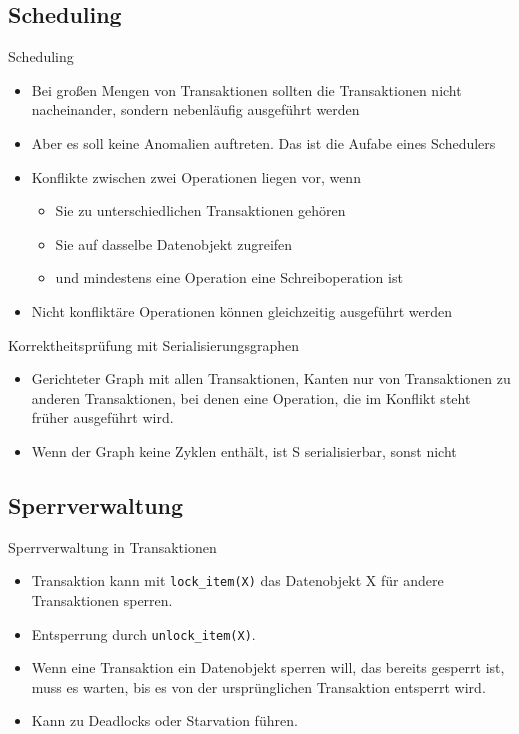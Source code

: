 \documentclass{article}
\begin{document}
\subsection*{Scheduling}
\begin{block}{Scheduling}
  \begin{itemize}
    \item Bei großen Mengen von Transaktionen sollten die Transaktionen nicht nacheinander, sondern nebenläufig ausgeführt werden
    \item Aber es soll keine Anomalien auftreten. Das ist die Aufabe eines Schedulers
    \item Konflikte zwischen zwei Operationen liegen vor, wenn
    \begin{itemize}
      \item Sie zu unterschiedlichen Transaktionen gehören
      \item Sie auf dasselbe Datenobjekt zugreifen
      \item und mindestens eine Operation eine Schreiboperation ist
    \end{itemize}
    \item Nicht konfliktäre Operationen können gleichzeitig ausgeführt werden
  \end{itemize}
\end{block}

\begin{block}{Korrektheitsprüfung mit Serialisierungsgraphen}
  \begin{itemize}
    \item Gerichteter Graph mit allen Transaktionen, Kanten nur von Transaktionen zu anderen Transaktionen, bei denen eine Operation, die im Konflikt steht früher ausgeführt wird.
    \item Wenn der Graph keine Zyklen enthält, ist S serialisierbar, sonst nicht
  \end{itemize}
\end{block}

\subsection*{Sperrverwaltung}
\begin{block}{Sperrverwaltung in Transaktionen}
  \begin{itemize}
    \item Transaktion kann mit \texttt{lock\_item(X)} das Datenobjekt X für andere Transaktionen sperren.
    \item Entsperrung durch \texttt{unlock\_item(X)}.
    \item Wenn eine Transaktion ein Datenobjekt sperren will, das bereits gesperrt ist, muss es warten, bis es von der ursprünglichen Transaktion entsperrt wird.
    \item Kann zu Deadlocks oder Starvation führen.
  \end{itemize}
\end{block}
\end{document}
